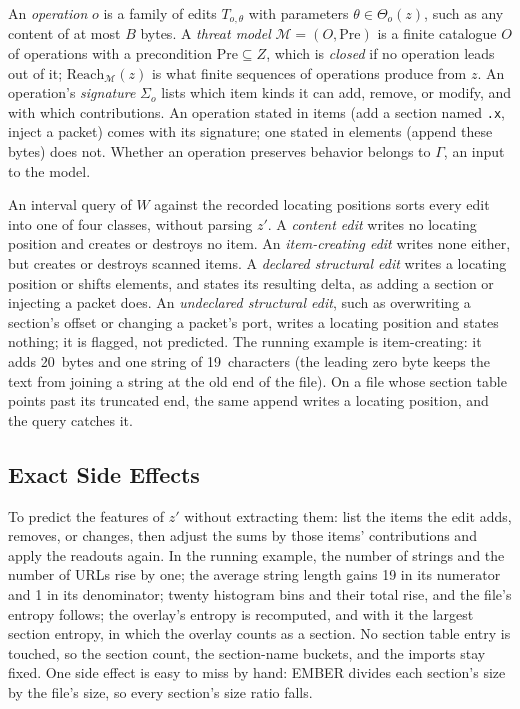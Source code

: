 An \emph{operation} $o$ is a family of edits $T_{o,\theta}$ with parameters $\theta \in \Theta_o(z)$, such as any
content of at most $B$ bytes. A \emph{threat model}
$\mathcal{M} = (O, \mathrm{Pre})$ is a finite catalogue $O$ of operations with a precondition
$\mathrm{Pre} \subseteq Z$, which is \emph{closed} if no operation leads out of it; $\mathrm{Reach}_\mathcal{M}(z)$
is what finite sequences of operations produce from $z$. An operation's
\emph{signature} $\Sigma_o$ lists which item kinds it can add, remove, or modify, and with which contributions. An
operation stated in items (add a section named \texttt{.x}, inject a packet) comes with its signature; one stated in
elements (append these bytes) does not. Whether an operation preserves behavior belongs to $\Gamma$, an input to the
model.

An interval query of $W$ against the recorded locating positions sorts every edit into one of four classes, without
parsing $z'$. A \emph{content edit} writes no locating position and creates or destroys no item. An
\emph{item-creating edit} writes none either, but creates or destroys scanned items. A \emph{declared structural edit}
writes a locating position or shifts elements, and states its resulting delta, as adding a section or injecting a
packet does. An \emph{undeclared structural edit}, such as overwriting a section's offset or changing a packet's
port, writes a locating position and states nothing; it is flagged, not predicted. The running example is
item-creating: it adds 20~bytes and one string of 19~characters (the leading zero byte keeps the text from joining a
string at the old end of the file). On a file whose section table points past its truncated end, the same append
writes a locating position, and the query catches it.

\subsection{Exact Side Effects}
\label{sec:fw:side-effects}

To predict the features of $z'$ without extracting them: list the items the edit adds,
removes, or changes, then adjust the sums by those items' contributions and apply the readouts again. In the running
example, the number of strings and the number of URLs rise by one; the average string length gains 19 in its
numerator and 1 in its denominator; twenty histogram bins and their total rise, and the file's entropy follows; the
overlay's entropy is recomputed, and with it the largest section entropy, in which the overlay counts as a section.
No section table entry is touched, so the section count, the section-name buckets, and the imports stay fixed. One
side effect is easy to miss by hand: EMBER divides each section's size by the file's size, so every section's size
ratio falls.

